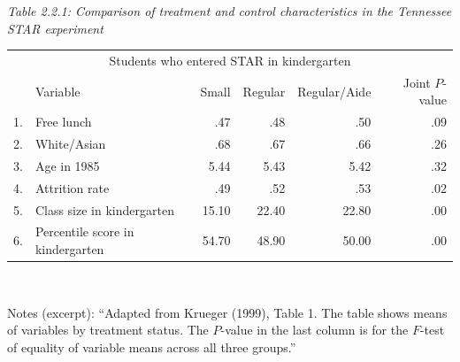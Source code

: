 \documentclass[11pt,a4paper]{article}
\begin{document}
\begin{center}\small
\textit{Table 2.2.1: Comparison of treatment and control characteristics in the Tennessee STAR experiment}\\[2pt]
\begin{tabular}{llrrrr}
\toprule
\multicolumn{6}{c}{Students who entered STAR in kindergarten}\\
& Variable & Small & Regular & Regular/Aide & Joint $P$-value\\
\midrule
1. & Free lunch & .47 & .48 & .50 & .09\\
2. & White/Asian & .68 & .67 & .66 & .26\\
3. & Age in 1985 & 5.44 & 5.43 & 5.42 & .32\\
4. & Attrition rate & .49 & .52 & .53 & .02\\
5. & Class size in kindergarten & 15.10 & 22.40 & 22.80 & .00\\
6. & Percentile score in kindergarten & 54.70 & 48.90 & 50.00 & .00\\
\bottomrule
\end{tabular}\\[2pt]
\parbox{0.9\linewidth}{\footnotesize Notes (excerpt): ``Adapted from Krueger (1999), Table 1. The table shows
means of variables by treatment status. The $P$-value in the last column is for the $F$-test of
equality of variable means across all three groups.''}


\end{center}
\end{document}
